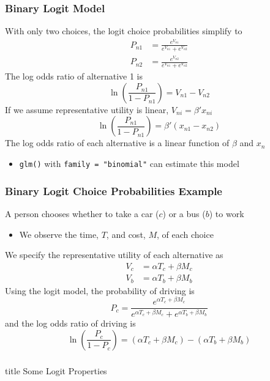 \documentclass{beamer}
\begin{document}
\begin{frame}\frametitle{Binary Logit Model}
    With only two choices, the logit choice probabilities simplify to
    \begin{align*}
    	P_{n1} &= \frac{e^{V_{n1}}}{e^{V_{n1}} + e^{V_{n2}}} \\
    	P_{n2} &= \frac{e^{V_{n2}}}{e^{V_{n1}} + e^{V_{n2}}}
    \end{align*}
    The log odds ratio of alternative 1 is
    $$\ln \left( \frac{P_{n1}}{1 - P_{n1}} \right) = V_{n1} - V_{n2}$$
    If we assume representative utility is linear, $V_{ni} = \beta' x_{ni}$
    $$\ln \left( \frac{P_{n1}}{1 - P_{n1}} \right) = \beta' (x_{n1} - x_{n2})$$
    The log odds ratio of each alternative is a linear function of $\beta$ and $x_n$
    \begin{itemize}
    	\item \texttt{glm()} with \texttt{family = "binomial"} can estimate this model
    \end{itemize}
\end{frame}

\begin{frame}\frametitle{Binary Logit Choice Probabilities Example}
    A person chooses whether to take a car ($c$) or a bus ($b$) to work
    \begin{itemize}
    	\item We observe the time, $T$, and cost, $M$, of each choice
    \end{itemize}
    \vspace{1ex}
    We specify the representative utility of each alternative as
    \begin{align*}
    	V_c &= \alpha T_c + \beta M_c \\
    	V_b &= \alpha T_b + \beta M_b
    \end{align*}
    Using the logit model, the probability of driving is
    $$P_c = \frac{e^{\alpha T_c + \beta M_c}}{e^{\alpha T_c + \beta M_c} + e^{\alpha T_b + \beta M_b}}$$
    and the log odds ratio of driving is
    $$\ln \left( \frac{P_c}{1 - P_c} \right) = (\alpha T_c + \beta M_c) - (\alpha T_b + \beta M_b)$$
\end{frame}

\begin{frame}\frametitle{}
    \vfill
    \centering
    \begin{beamercolorbox}[center]{title}
        \Large Some Logit Properties
    \end{beamercolorbox}
    \vfill
\end{frame}
\end{document}
